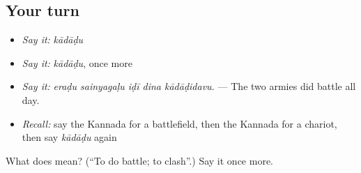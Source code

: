 \subsection*{Your turn}
\begin{itemize}
\raggedright
  \item \emph{Say it:} \emph{kādāḍu}
  \item \emph{Say it:} \emph{kādāḍu}, once more
  \item \emph{Say it:} \emph{eraḍu sainyagaḷu iḍī dina kādāḍidavu.} — The two armies did battle all day.
  \item \emph{Recall:} say the Kannada for a battlefield, then the Kannada for a chariot, then say \emph{kādāḍu} again
\end{itemize}

\begin{tcolorbox}[breakable,colback=teal!4,colframe=teal!35!black,title={Before you move on}]
What does  mean? (\textquotedblleft{}To do battle; to clash\textquotedblright{}.) Say it once more.
\end{tcolorbox}
